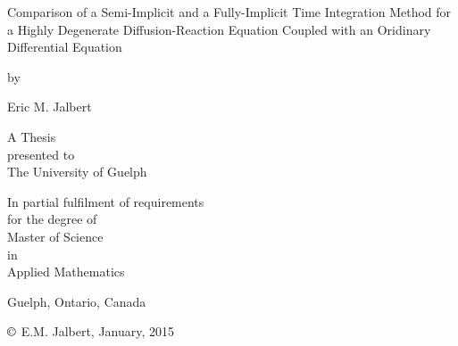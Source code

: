 \begin{titlepage}
  \begin{center}
    \vspace*{4cm}
    \LARGE\large{Comparison of a Semi-Implicit and a Fully-Implicit Time Integration Method for a Highly Degenerate Diffusion-Reaction Equation Coupled with an Oridinary Differential Equation}
    \vspace*{0.5cm}
    
    \small{by}
    \vspace*{0.5cm}
    
    \large{Eric M. Jalbert}
    \vspace*{3.5cm}
    
    A Thesis\\presented to\\The University of Guelph
    \vspace*{1.5cm}
    
    In partial fulfilment of requirements\\for the degree of\\Master of Science\\in\\Applied Mathematics
    \vfill

    Guelph, Ontario, Canada
    
    $\copyright$ E.M. Jalbert, January, 2015
  \end{center}
\end{titlepage}





